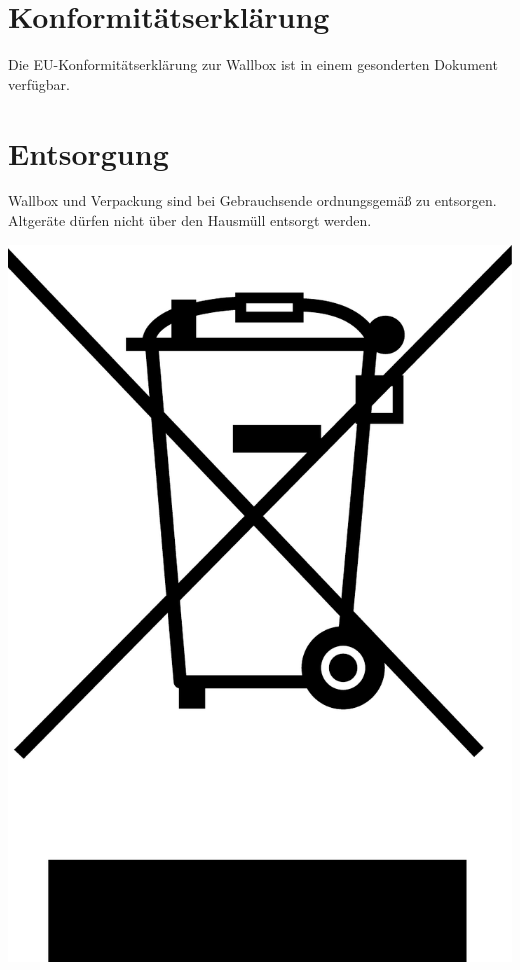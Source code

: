 \documentclass[a4paper,10pt]{article}
\begin{document}
\begin{multicols*}{2}
    \section{Konformitätserklärung}
    Die EU-Konformitätserklärung zur Wallbox ist in einem gesonderten Dokument verfügbar.

    \section{Entsorgung}
    \begin{minipage}{0.43\textwidth}
        Wallbox und Verpackung sind bei Gebrauchsende ordnungsgemäß zu
        entsorgen. Altgeräte dürfen nicht über den Hausmüll entsorgt werden.
    \end{minipage}\hfill
    \begin{minipage}{0.045\textwidth}
        \includegraphics[width=\linewidth]{./img_warp2/resized/weee.pdf}
    \end{minipage}


\end{multicols*}
\end{document}
